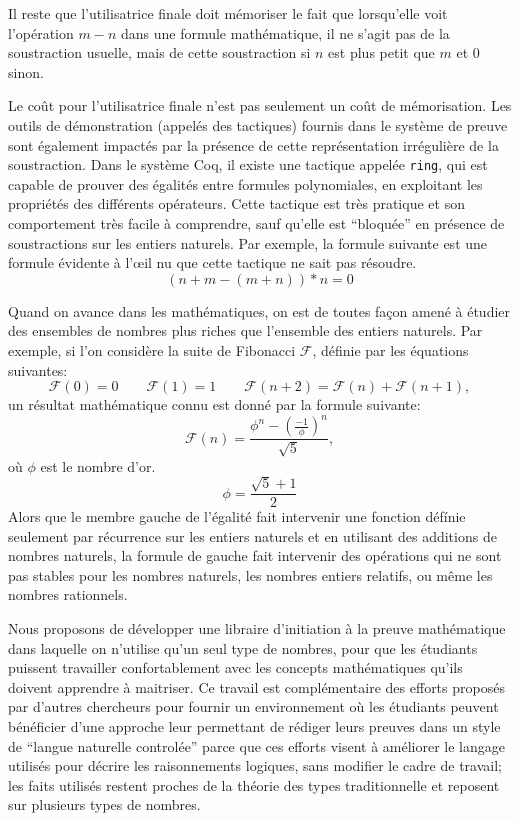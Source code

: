 \documentclass[draft]{jflart}
\begin{document}
Il reste que l'utilisatrice finale doit mémoriser le fait que
lorsqu'elle voit l'opération \(m - n\) dans une formule mathématique,
il ne s'agit pas de la soustraction usuelle, mais de cette
soustraction si \(n\) est plus petit que \(m\) et 0 sinon.

Le coût pour l'utilisatrice finale n'est pas seulement un coût de
mémorisation.  Les outils de démonstration (appelés des tactiques)
fournis dans le système de preuve sont également impactés par la
présence de cette représentation irrégulière de la soustraction.
Dans le système Coq, il existe une tactique appelée \texttt{ring}, qui
est capable de prouver des égalités entre formules polynomiales, en
exploitant les propriétés des différents opérateurs.  Cette tactique
est très pratique et son comportement très facile à comprendre, sauf
qu'elle est ``bloquée'' en présence de soustractions sur les entiers
naturels.  Par exemple, la formule suivante est une formule évidente à
l'œil nu que cette tactique ne sait pas résoudre.
\[(n + m - (m + n)) * n = 0\]

Quand on avance dans les mathématiques, on est de toutes façon amené à
étudier des ensembles de nombres plus riches que l'ensemble des
entiers naturels.  Par exemple, si l'on considère la suite de
Fibonacci \({\mathcal F}\), définie par les équations suivantes:
\[{\mathcal F}(0) = 0 \qquad {\mathcal F}(1)= 1\qquad {\mathcal F}(n +
2) = {\mathcal F}(n) + {\mathcal F}(n + 1),\]
un résultat mathématique connu est donné par la formule suivante:
\[{\mathcal F} (n) = \frac{\phi ^n - ({\frac{-1}{\phi}}) ^
  n}{\sqrt{5}},\]
où \(\phi\) est le nombre d'or.
\[\phi = \frac{\sqrt{5} + 1}{2}\]
Alors que le membre gauche de l'égalité fait intervenir une fonction défínie
seulement par récurrence sur les entiers naturels et en utilisant des
additions de nombres naturels, la formule de gauche fait intervenir des
opérations qui ne sont pas stables pour les nombres naturels, les nombres
entiers relatifs, ou même les nombres rationnels.

Nous proposons de développer une libraire d'initiation à la preuve
mathématique dans laquelle on n'utilise qu'un seul type de nombres,
pour que les étudiants puissent travailler confortablement avec les
concepts mathématiques qu'ils doivent apprendre à maitriser.  Ce
travail est complémentaire des efforts proposés par d'autres
chercheurs pour fournir un environnement où les étudiants peuvent
bénéficier d'une approche leur permettant de rédiger leurs preuves
dans un style de ``langue naturelle controlée'' parce que ces efforts
visent à améliorer le langage utilisés pour décrire les raisonnements
logiques, sans modifier le cadre de travail; les faits utilisés
restent proches de la théorie des types traditionnelle et reposent sur
plusieurs types de nombres.
\end{document}
